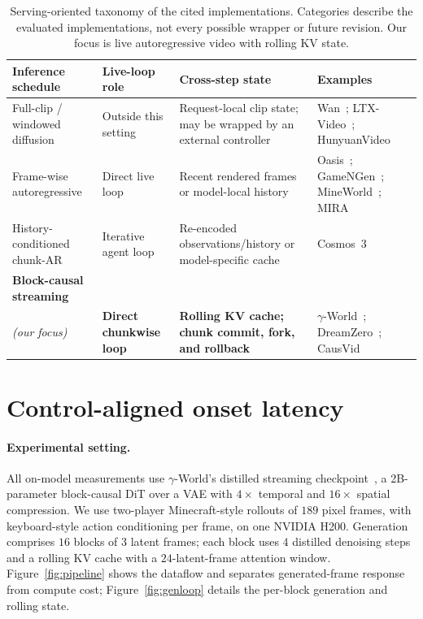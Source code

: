 \documentclass[11pt]{article}
\begin{document}
\begin{table}[t]
\centering
\caption{Serving-oriented taxonomy of the cited implementations. Categories describe the evaluated implementations, not every possible wrapper or future revision. Our focus is live autoregressive video with rolling KV state.}
\label{tab:regimes}
\small
\begingroup
\renewcommand{\arraystretch}{1.18}
\setlength{\tabcolsep}{5pt}
\begin{tabularx}{\textwidth}{@{}L{3.0cm}L{2.35cm}Y L{3.2cm}@{}}
\toprule
\textbf{Inference schedule} & \textbf{Live-loop role} &
\textbf{Cross-step state} & \textbf{Examples} \\
\midrule
Full-clip / windowed diffusion &
Outside this setting &
Request-local clip state; may be wrapped by an external controller &
Wan~\cite{wan}; LTX-Video~\cite{ltx}; HunyuanVideo~\cite{hunyuanvideo} \\
\addlinespace[2pt]
Frame-wise autoregressive &
Direct live loop &
Recent rendered frames or model-local history &
Oasis~\cite{oasis}; GameNGen~\cite{gamengen}; MineWorld~\cite{mineworld}; MIRA~\cite{mira} \\
\addlinespace[2pt]
History-conditioned chunk-AR &
Iterative agent loop &
Re-encoded observations/history or model-specific cache &
Cosmos~3~\cite{cosmos3} \\
\addlinespace[2pt]
\textbf{Block-causal streaming}\\\emph{(our focus)} &
\textbf{Direct chunkwise loop} &
\textbf{Rolling KV cache; chunk commit, fork, and rollback} &
$\gamma$-World~\cite{gammaworld}; DreamZero~\cite{dreamzero}; CausVid~\cite{causvid} \\
\bottomrule
\end{tabularx}
\endgroup
\end{table}

\section{Control-aligned onset latency}
\label{sec:a2e}

\paragraph{Experimental setting.}
All on-model measurements use $\gamma$-World's distilled streaming checkpoint~\cite{gammaworld}, a 2B-parameter block-causal DiT over a VAE with $4\times$ temporal and $16\times$ spatial compression. We use two-player Minecraft-style rollouts of $189$ pixel frames, with keyboard-style action conditioning per frame, on one NVIDIA H200. Generation comprises $16$ blocks of $3$ latent frames; each block uses $4$ distilled denoising steps and a rolling KV cache with a $24$-latent-frame attention window. Figure~\ref{fig:pipeline} shows the dataflow and separates generated-frame response from compute cost; Figure~\ref{fig:genloop} details the per-block generation and rolling state.
\end{document}

